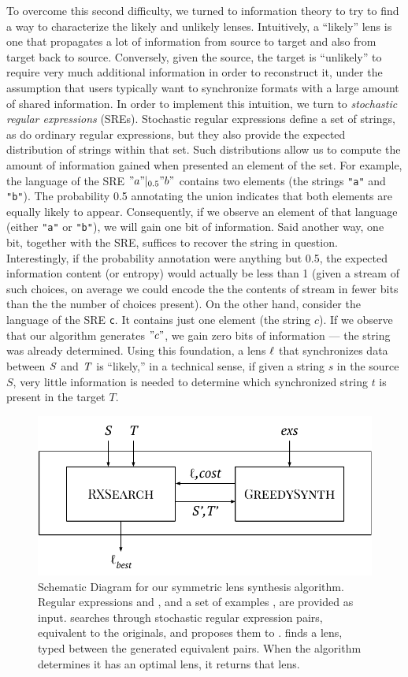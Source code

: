\documentclass[acmsmall,screen,anonymous]{acmart}
\begin{document}
To overcome this second difficulty, we turned to information theory to try to
find a way to characterize the likely and unlikely lenses. Intuitively, a
``likely'' lens is one that propagates a lot of information from source to
target and also from target back to source. Conversely, given the source, the
target is ``unlikely'' to require very much additional information in order to
reconstruct it, under the assumption that users typically want to synchronize
formats with a large amount of shared information. In order to implement this
intuition, we turn to \emph{stochastic regular expressions} (SREs). Stochastic
regular expressions define a set of strings, as do ordinary regular expressions,
but they also provide the expected distribution of strings within that set. Such
distributions allow us to compute the amount of information gained when
presented an element of the set. For example, the language of the SRE
$\lstinline{"a"} |_{0.5}
\lstinline{"b"}$ contains two elements (the strings \lstinline{"a"} and \lstinline{"b"}).
The probability 0.5 annotating the union indicates that both elements are
equally likely to appear. Consequently, if we observe an element of that
language (either \lstinline{"a"} or
\lstinline{"b"}), we will gain one bit of information. Said another way, one bit, together with
the SRE, suffices to recover the string in question. Interestingly, if the
probability annotation were anything but 0.5, the expected information content
(or entropy) would actually be less than 1 (given a stream of such choices, on
average we could encode the the contents of stream in fewer bits than the the
number of choices present). On the other hand, consider the language of the SRE
\lstinline{c}. It contains just one element (the string $c$). If we observe that
our algorithm generates $\lstinline{"c"}$, we gain zero bits of information ---
the string was already determined. Using this foundation, a lens $\mathit{\ell}$ that
synchronizes data between $\mathit{S}$ and $\mathit{T}$ is ``likely,''
in a technical sense, if given a string $s$ in the source $S$, very little information
is needed to determine which synchronized string $t$ is present in the target
$T$.

\begin{figure}
  \includegraphics[width=.5\textwidth]{high-level-algorithm.pdf}
  \caption{Schematic Diagram for our symmetric lens synthesis algorithm. Regular
    expressions \Regex and \RegexAlt, and a set of examples \Examples, are
    provided as input. \Expand searches through stochastic regular expression
    pairs, equivalent to the originals, and proposes them to \GreedySynth.
    \GreedySynth finds a lens, typed between the generated equivalent pairs.
    When the algorithm determines it has an optimal lens, it returns that lens.}
  \label{fig:high-level-algorithm}
\end{figure}
\end{document}
